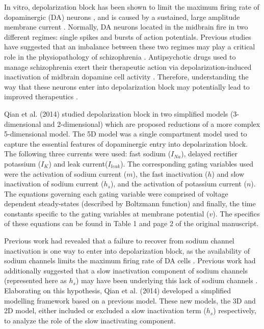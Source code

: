 \newcommand{\colorhref}[2]{\href{#1}{\color{blue}{#2}}}

In vitro, depolarization block has been shown to limit the maximum firing rate of dopaminergic (DA) neurons \cite{Richards1997}, and is caused by a sustained, large amplitude membrane current \cite{Bianchi2012}. Normally, DA neurons located in the midbrain fire in two different regimes: single spikes and bursts of action potentials. Previous studies have suggested that an imbalance between these two regimes may play a critical role in the physiopathology of schizophrenia \cite{Benamer2018}. Antipsychotic drugs used to manage schizophrenia exert their therapeutic action via depolarization-induced inactivation of midbrain dopamine cell activity \cite{Grace1997}. Therefore, understanding the way that these neurons enter into depolarization block may potentially lead to improved therapeutics \cite{Qian2014}.

Qian et al. (2014) studied depolarization block in two simplified models (3-dimensional and 2-dimensional) which are proposed reductions of a more complex 5-dimensional model. The 5D model was a single compartment model used to capture the essential features of dopaminergic entry into depolarization block. The following three currents were used: fast sodium ($I_{Na}$), delayed rectifier potassium ($I_{K}$) and leak current($I_{leak}$). The corresponding gating variables used were the activation of sodium current ($m$), the fast inactivation ($h$) and slow inactivation of sodium current ($h_s$), and the activation of potassium current ($n$). The equations governing each gating variable were comprised of voltage dependent steady-states (described by Boltzmann function) and finally, the time constants specific to the gating variables at membrane potential ($v$). The specifics of these equations can be found in Table 1 and page 2 of the original manuscript. 

Previous work had revealed that a failure to recover from sodium channel inactivation is one way to enter into depolarization block, as the availability of sodium channels limits the maximum firing rate of DA cells \cite{Qian2014, Deister2009,Kuznetsova2010}. Previous work had additionally suggested that a slow inactivation component of sodium channels (represented here as $h_s$) may have been underlying this lack of sodium channels \cite{Ding2011}. Elaborating on this hypothesis, Qian et al. (2014) developed a simplified modelling framework based on a previous model. These new models, the 3D and 2D model, either included or excluded a slow inactivation term ($h_s$) respectively, to analyze the role of the slow inactivating component.

